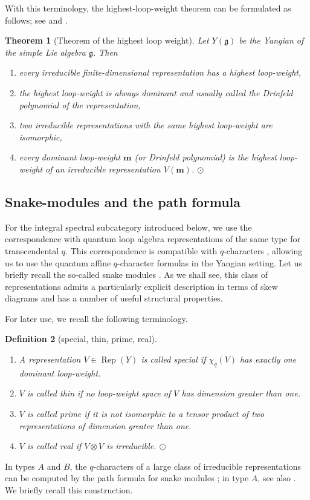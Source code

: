 \documentclass[12pt,reqno]{amsart}
\numberwithin{equation}{section}
\newtheorem{thm}{Theorem}[section]
\newtheorem{definition}[thm]{Definition}
\begin{document}
    With this terminology, the highest-loop-weight theorem can be formulated as follows; see \cite[Section~3.2]{GT} and \cite{JuergensMaster,HL,FM,FR}.
	\begin{thm}[Theorem of the highest loop weight]\label{thm:highest_loop_weight}
		Let $Y(\mathfrak{g})$ be the Yangian of the simple Lie algebra $\mathfrak{g}$. Then
		\begin{enumerate}
			\item every {irreducible finite-dimensional representation} has a {highest loop-weight},
			\item the {highest loop-weight} is always  {dominant} and usually called the  {Drinfeld polynomial} of the representation,
			\item two {irreducible representations} with the {same highest loop-weight} are {isomorphic},
			\item every {dominant} {loop-weight} $\boldsymbol{m}$ (or {Drinfeld polynomial}) is the {highest loop-weight} of an {irreducible representation} $V(\boldsymbol{m})$. $\odot$
		\end{enumerate}
	\end{thm}
     
	\subsection{Snake-modules and the path formula}
	For the integral spectral subcategory introduced below, we use
the correspondence with quantum loop algebra representations of the
same type for transcendental $q$. This correspondence is compatible
with $q$-characters \cite[Sections~1.8 and~7.7]{GT}, allowing us to
use the quantum affine $q$-character formulas in the Yangian setting.
Let us briefly recall the so-called snake modules
\cite{MY,MY2,CPBook}. As we shall see, this class of representations admits
a particularly explicit description in terms of skew diagrams and has a
number of useful structural properties.

For later use, we recall the following terminology.
\begin{definition}[special, thin, prime, real]~
	\begin{enumerate}
		\item A representation $V\in\operatorname{Rep}(Y)$ is called {special} if $\chi_q(V)$ has {exactly one dominant loop-weight}.
		\item $V$ is called {thin} if {no loop-weight space} of $V$ has  {dimension greater} than  {one}.
		\item $V$ is called {prime} if it is {not isomorphic to a tensor product} of two representations of dimension greater than one.
		\item $V$ is called {real} if $V\otimes V$ is {irreducible}. $\odot$
	\end{enumerate}
\end{definition}
In types $A$ and $B$, the $q$-characters of a large class of irreducible representations can be computed by the path formula for snake modules \cite{MY}; in type $A$, see also \cite{NT1998}. We briefly recall this construction.
\end{document}
